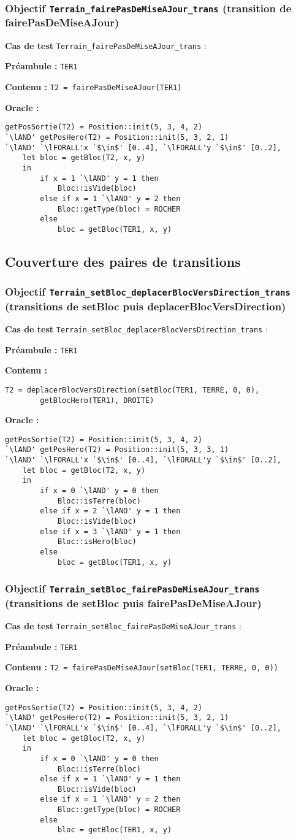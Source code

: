 \documentclass{article}
\newcommand{\cmd}[1]{\texttt{#1}}
\newcommand{\lAND}{$\land$}
\newcommand{\lFORALL}{$\forall$}
\newcommand{\obj}[2]{\subsubsection*{\large{\textbf{Objectif {\cmd{#1} (#2)}}}}}
\newenvironment{cas}[1]
{
	\hspace{1em}\textbf{Cas de test} \cmd{#1} :
	\begin{list}{}{}
}{
	\end{list}\vspace{1em}
}
\newcommand{\pre}[1]{\item \textbf{Préambule :} \cmd{#1}}
\newcommand{\ope}[1]{\item \textbf{Contenu :} \cmd{#1}}
\newcommand{\oram}{\item \textbf{Oracle :}}
\newcommand{\opem}{\item \textbf{Contenu :}}
\begin{document}
\obj{Terrain\_fairePasDeMiseAJour\_trans} {transition de fairePasDeMiseAJour}
	\begin{cas} {Terrain\_fairePasDeMiseAJour\_trans}
		\pre{TER1}
		\ope{T2 = fairePasDeMiseAJour(TER1)}
		\oram{}
		\begin{lstlisting}
getPosSortie(T2) = Position::init(5, 3, 4, 2)
`\lAND' getPosHero(T2) = Position::init(5, 3, 2, 1)
`\lAND' `\lFORALL'x `$\in$' [0..4], `\lFORALL'y `$\in$' [0..2],
	let bloc = getBloc(T2, x, y)
	in
		if x = 1 `\lAND' y = 1 then
			Bloc::isVide(bloc)
		else if x = 1 `\lAND' y = 2 then
			Bloc::getType(bloc) = ROCHER
		else
			bloc = getBloc(TER1, x, y)
		\end{lstlisting}
	\end{cas}


\subsection*{Couverture des paires de transitions}

\obj{Terrain\_setBloc\_deplacerBlocVersDirection\_trans} {transitions de setBloc puis deplacerBlocVersDirection}
	\begin{cas} {Terrain\_setBloc\_deplacerBlocVersDirection\_trans}
		\pre{TER1}
		\opem{}
		\begin{lstlisting}
T2 = deplacerBlocVersDirection(setBloc(TER1, TERRE, 0, 0),
		getBlocHero(TER1), DROITE)
		\end{lstlisting}
		\oram{}
		\begin{lstlisting}
getPosSortie(T2) = Position::init(5, 3, 4, 2)
`\lAND' getPosHero(T2) = Position::init(5, 3, 3, 1)
`\lAND' `\lFORALL'x `$\in$' [0..4], `\lFORALL'y `$\in$' [0..2],
	let bloc = getBloc(T2, x, y)
	in
		if x = 0 `\lAND' y = 0 then
			Bloc::isTerre(bloc)
		else if x = 2 `\lAND' y = 1 then
			Bloc::isVide(bloc)
		else if x = 3 `\lAND' y = 1 then
			Bloc::isHero(bloc)
		else
			bloc = getBloc(TER1, x, y)
		\end{lstlisting}
	\end{cas}

\obj{Terrain\_setBloc\_fairePasDeMiseAJour\_trans} {transitions de setBloc puis fairePasDeMiseAJour}
	\begin{cas} {Terrain\_setBloc\_fairePasDeMiseAJour\_trans}
		\pre{TER1}
		\ope{T2 = fairePasDeMiseAJour(setBloc(TER1, TERRE, 0, 0))}
		\oram{}
		\begin{lstlisting}
getPosSortie(T2) = Position::init(5, 3, 4, 2)
`\lAND' getPosHero(T2) = Position::init(5, 3, 2, 1)
`\lAND' `\lFORALL'x `$\in$' [0..4], `\lFORALL'y `$\in$' [0..2],
	let bloc = getBloc(T2, x, y)
	in
		if x = 0 `\lAND' y = 0 then
			Bloc::isTerre(bloc)
		else if x = 1 `\lAND' y = 1 then
			Bloc::isVide(bloc)
		else if x = 1 `\lAND' y = 2 then
			Bloc::getType(bloc) = ROCHER
		else
			bloc = getBloc(TER1, x, y)
		\end{lstlisting}
	\end{cas}
\end{document}
